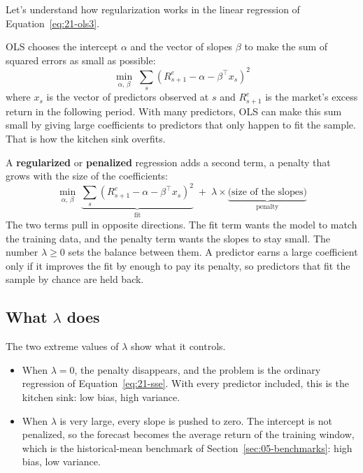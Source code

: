 Let's understand how regularization works in the linear regression of Equation~\eqref{eq:21-ols3}. 

OLS chooses the intercept $\alpha$ and the vector of slopes $\beta$ to make the sum of squared errors as small as possible:
\begin{equation}
  \min_{\alpha,\,\beta} \; \sum_{s} \left(R^{e}_{s+1} - \alpha - \beta^{\top} x_s\right)^2
  \label{eq:21-sse}
\end{equation}
where $x_s$ is the vector of predictors observed at $s$ and $R^{e}_{s+1}$ is the market's excess return in the following period. With many predictors, OLS can make this sum small by giving large coefficients to predictors that only happen to fit the sample. That is how the kitchen sink overfits.

A \textbf{regularized} or \textbf{penalized} regression adds a second term, a penalty that grows with the size of the coefficients:
\begin{equation}
  \min_{\alpha,\,\beta} \; \underbrace{\sum_{s} \left(R^{e}_{s+1} - \alpha - \beta^{\top} x_s\right)^2}_{\text{fit}}
  \; + \; \lambda \times \underbrace{\text{(size of the slopes)}}_{\text{penalty}}
  \label{eq:21-penalty}
\end{equation}
The two terms pull in opposite directions. The fit term wants the model to match the training data, and the penalty term wants the slopes to stay small. The number $\lambda \ge 0$ sets the balance between them. A predictor earns a large coefficient only if it improves the fit by enough to pay its penalty, so predictors that fit the sample by chance are held back.

\subsection{What \texorpdfstring{$\lambda$}{lambda} does}

The two extreme values of $\lambda$ show what it controls.

\begin{itemize}
  \item When $\lambda = 0$, the penalty disappears, and the problem is the ordinary regression of Equation~\eqref{eq:21-sse}. With every predictor included, this is the kitchen sink: low bias, high variance.
  \item When $\lambda$ is very large, every slope is pushed to zero. The intercept is not penalized, so the forecast becomes the average return of the training window, which is the historical-mean benchmark of Section~\ref{sec:05-benchmarks}: high bias, low variance.
\end{itemize}

